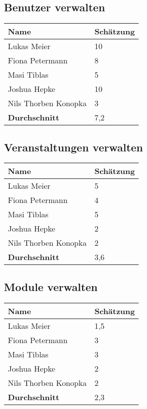 \newpage

\subsection{Benutzer verwalten}
\begin{tabular} {|p{5cm}|p{}|}
	\hline
	Name & Schätzung \\
	\hline
	Lukas Meier 
	& 10 \\
	\hline
	Fiona Petermann 
	& 8 \\
	\hline
	Masi Tiblas 
	& 5 \\
	\hline
	Joshua Hepke
	& 10 \\
	\hline
	Nils Thorben Konopka
	& 3 \\
	\hline \hline
	\textbf{Durchschnitt}
	& 7,2 \\
	\hline
\end{tabular}

\newpage

\subsection{Veranstaltungen verwalten}
\begin{tabular} {|p{5cm}|p{}|}
	\hline
	Name & Schätzung \\
	\hline
	Lukas Meier 
	& 5 \\
	\hline
	Fiona Petermann 
	& 4 \\
	\hline
	Masi Tiblas 
	& 5 \\
	\hline
	Joshua Hepke
	& 2 \\
	\hline
	Nils Thorben Konopka
	& 2 \\
	\hline \hline
	\textbf{Durchschnitt}
	& 3,6 \\
	\hline
\end{tabular}

\newpage

\subsection{Module verwalten}
\begin{tabular} {|p{5cm}|p{}|}
	\hline
	Name & Schätzung \\
	\hline
	Lukas Meier 
	& 1,5 \\
	\hline
	Fiona Petermann 
	& 3 \\
	\hline
	Masi Tiblas 
	& 3 \\
	\hline
	Joshua Hepke
	& 2 \\
	\hline
	Nils Thorben Konopka
	& 2 \\
	\hline \hline
	\textbf{Durchschnitt}
	& 2,3 \\
	\hline
\end{tabular}
